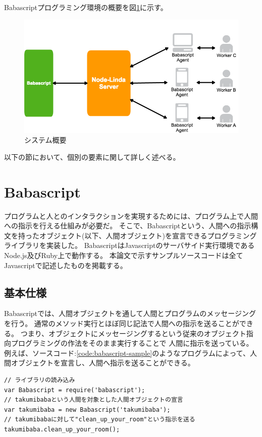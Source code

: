 Babascriptプログラミング環境の概要を図\ref{fig:system_image}に示す。

\begin{figure}[htbp]
  \begin{center}
  \includegraphics[width=.7\linewidth,bb=0 0 834 443]{images/overview.png}
  \end{center}
  \caption{システム概要}
  \label{fig:system_image}
\end{figure}

以下の節において、個別の要素に関して詳しく述べる。

\section{Babascript}\label{babascript}

プログラムと人とのインタラクションを実現するためには、プログラム上で人間への指示を行える仕組みが必要だ。
そこで、Babascriptという、人間への指示構文を持ったオブジェクト(以下、人間オブジェクト)を宣言できるプログラミングライブラリを実装した。
BabascriptはJavascriptのサーバサイド実行環境であるNode.js及びRuby上で動作する。
本論文で示すサンプルソースコードは全てJavascriptで記述したものを掲載する。

\subsection{基本仕様}\label{ux57faux672cux4ed5ux69d8}

Babascriptでは、人間オブジェクトを通して人間とプログラムのメッセージングを行う。
通常のメソッド実行とほぼ同じ記法で人間への指示を送ることができる。
つまり、オブジェクトにメッセージングするという従来のオブジェクト指向プログラミングの作法をそのまま実行することで
人間に指示を送っている。
例えば、ソースコード:\ref{code:babascript-sample}のようなプログラムによって、人間オブジェクトを宣言し、人間へ指示を送ることができる。

\begin{lstlisting}[caption=人への指示構文, label=code:babascript-sample]
// ライブラリの読み込み
var Babascript = require('babascript');
// takumibabaという人間を対象とした人間オブジェクトの宣言
var takumibaba = new Babascript('takumibaba');
// takumibabaに対して"clean_up_your_room"という指示を送る
takumibaba.clean_up_your_room();
\end{lstlisting}

